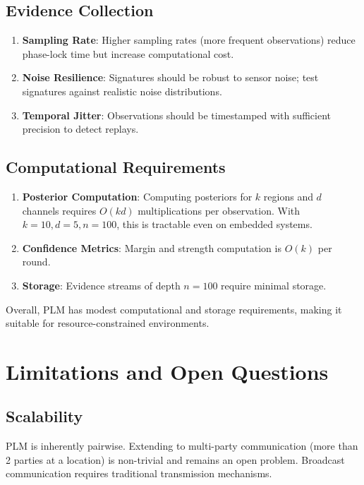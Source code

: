 \documentclass[11pt,a4paper]{article}
\theoremstyle{definition}
\begin{document}
\subsection{Evidence Collection}

\begin{enumerate}
\item \textbf{Sampling Rate}: Higher sampling rates (more frequent observations) reduce phase-lock time but increase computational cost.
\item \textbf{Noise Resilience}: Signatures should be robust to sensor noise; test signatures against realistic noise distributions.
\item \textbf{Temporal Jitter}: Observations should be timestamped with sufficient precision to detect replays.
\end{enumerate}

\subsection{Computational Requirements}

\begin{enumerate}
\item \textbf{Posterior Computation}: Computing posteriors for $k$ regions and $d$ channels requires $O(kd)$ multiplications per observation. With $k=10, d=5, n=100$, this is tractable even on embedded systems.
\item \textbf{Confidence Metrics}: Margin and strength computation is $O(k)$ per round.
\item \textbf{Storage}: Evidence streams of depth $n=100$ require minimal storage.
\end{enumerate}

Overall, PLM has modest computational and storage requirements, making it suitable for resource-constrained environments.

\section{Limitations and Open Questions}
\label{sec:limitations}

\subsection{Scalability}

PLM is inherently pairwise. Extending to multi-party communication (more than 2 parties at a location) is non-trivial and remains an open problem. Broadcast communication requires traditional transmission mechanisms.
\end{document}
